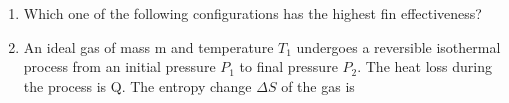 \documentclass[journal,12pt,onecolumn]{IEEEtran}
\begin{document}
\begin{enumerate}
          \begin{enumerate}
          \end{enumerate}

    \item Which one of the following configurations has the highest fin effectiveness?

          \begin{enumerate}
          \end{enumerate}

    \item An ideal gas of mass m and temperature \(T_1\) undergoes a reversible isothermal process from an initial pressure \(P_1\) to final pressure \(P_2\). The heat loss during the process is Q. The entropy change \(\Delta S\) of the gas is

          \begin{enumerate}
          \end{enumerate}


\end{enumerate}
\end{document}
